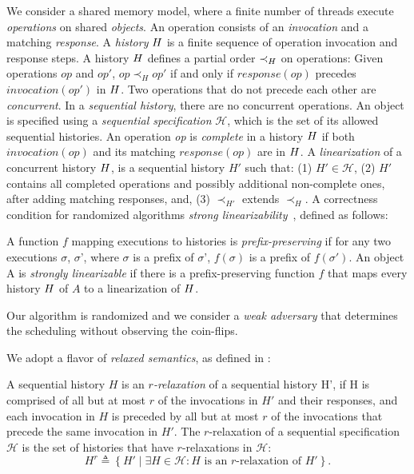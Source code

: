 
We consider a shared memory model, where a finite number of threads execute \emph{operations} on shared \emph{objects}. An operation consists of an \emph{invocation} and a matching \emph{response}. A \emph{history} \(\mathnormal{H}\) is a finite sequence of operation invocation and response steps. A history \(\mathnormal{H}\) defines a partial order \(\prec_\mathnormal{H}\) on operations: Given operations \(op\) and \(op'\), \(op \prec_H op'\) if and only if \(response(op)\) precedes \(invocation(op')\) in \(\mathnormal{H}\). Two operations that do not precede each other are \emph{concurrent}. In a \emph{sequential history}, there are no concurrent operations. An object is specified using a \emph{sequential specification} $\mathcal{H}$, which is the set of its allowed sequential histories.
An operation \emph{op} is \emph{complete} in a history \(\mathnormal{H}\) if both \(invocation(op)\) and its matching \(response(op)\) are in \(\mathnormal{H}\).
A \emph{linearization} of a concurrent history \(\mathnormal{H}\), is a sequential history $H'$ such that: (1) $H' \in \mathcal{H}$, (2) $H'$ contains all completed operations and possibly additional non-complete ones, after adding matching responses, and, (3) $\prec_{H'}$ extends $\prec_H$. A correctness condition for randomized algorithms \emph{strong linearizability}~\cite{strong_linearizability}, defined as follows: 

\begin{definition}
\label{def:strong_linearizability}
A function \(f\) mapping executions to histories is \emph{prefix-preserving} if for any two executions $\sigma$, $\sigma$', where $\sigma$ is a prefix of $\sigma$', $f(\sigma)$ is a prefix of $f(\sigma')$. 
An object A is \emph{strongly linearizable} if there is a prefix-preserving function \(f\) that maps every history \(\mathnormal{H}\) of $A$ to a linearization of \(\mathnormal{H}\).
\end{definition}

Our algorithm is randomized and we consider a \emph{weak adversary} that determines the scheduling without observing the coin-flips.

We adopt a flavor of \emph{relaxed semantics}, as defined in \cite{Henzinger_2013_Quantitative_Relaxation}:

\begin{definition}[$r$-relaxation] \label{def:r-relaxtion}
A sequential history $H$ is an \emph{$r$-relaxation} of a sequential history H', if H is comprised of all but at most $r$ of the invocations in $H'$ and their responses,
and each invocation in $H$ is preceded by all but at most $r$ of the invocations that precede the same invocation in $H'$.
The $r$-relaxation of a sequential specification $\mathcal{H}$ is the set of histories that have $r$-relaxations in $\mathcal{H}$:
\[{H}^r \triangleq \left\{ H' \mid \exists H \in \mathcal{H}: H \text{ is an } r\text{-relaxation of } H'\right\}. \]
\end{definition}
